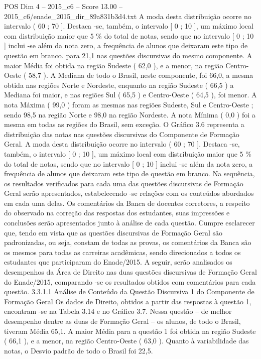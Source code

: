 \begin{textsample}{POS Dim 4 – 2015\_c6 – Score 13.00 – 2015\_c6/enade\_2015\_dir\_89a831b3d4.txt}
A moda desta distribuição ocorre no intervalo ( 60 ; 70 ].
Destaca -se, também, o intervalo [ 0 ; 10 ], um máximo local com distribuição maior que 5 \% do total de notas, sendo que no intervalo [ 0 ; 10 ] inclui -se além da nota zero, a frequência de alunos que deixaram este tipo de questão em branco. para 21,1 nas questões discursivas do mesmo componente.
A maior Média foi obtida na região Sudeste ( 62,0 ), e a menor, na região Centro-Oeste ( 58,7 ).
A Mediana de todo o Brasil, neste componente, foi 66,0, a mesma obtida nas regiões Norte e Nordeste, enquanto na região Sudeste ( 66,5 ) a Mediana foi maior, e nas regiões Sul ( 65,5 ) e Centro-Oeste ( 64,5 ), foi menor.
A nota Máxima ( 99,0 ) foram as mesmas nas regiões Sudeste, Sul e Centro-Oeste ; sendo 98,5 na região Norte e 98,0 na região Nordeste.
A nota Mínima ( 0,0 ) foi a mesma em todas as regiões do Brasil, sem exceção.
O Gráfico 3.6 representa a distribuição das notas nas questões discursivas do Componente de Formação Geral.
A moda desta distribuição ocorre no intervalo ( 60 ; 70 ].
Destaca -se, também, o intervalo [ 0 ; 10 ], um máximo local com distribuição maior que 5 \% do total de notas, sendo que no intervalo [ 0 ; 10 ] inclui -se além da nota zero, a frequência de alunos que deixaram este tipo de questão em branco.
Na sequência, os resultados verificados para cada uma das questões discursivas de Formação Geral serão apresentados, estabelecendo -se relações com os conteúdos abordados em cada uma delas.
Os comentários da Banca de docentes corretores, a respeito do observado na correção das respostas dos estudantes, suas impressões e conclusões serão apresentados junto à análise de cada questão.
Cumpre esclarecer que, tendo em vista que as questões discursivas de Formação Geral são padronizadas, ou seja, constam de todas as provas, os comentários da Banca são os mesmos para todas as carreiras acadêmicas, sendo direcionados a todos os estudantes que participaram do Enade/2015.
A seguir, serão analisados os desempenhos da Área de Direito nas duas questões discursivas de Formação Geral do Enade/2015, comparando -se os resultados obtidos com comentários para cada questão. 3.3.1.1 Análise de Conteúdo da Questão Discursiva 1 do Componente de Formação Geral Os dados de Direito, obtidos a partir das respostas à questão 1, encontram -se na Tabela 3.14 e no Gráfico 3.7.
Nessa questão – de melhor desempenho dentre as duas de Formação Geral – os alunos, de todo o Brasil, tiveram Média 65,1.
A maior Média para a questão 1 foi obtida na região Sudeste ( 66,1 ), e a menor, na região Centro-Oeste ( 63,0 ).
Quanto à variabilidade das notas, o Desvio padrão de todo o Brasil foi 22,5.

\end{textsample}
